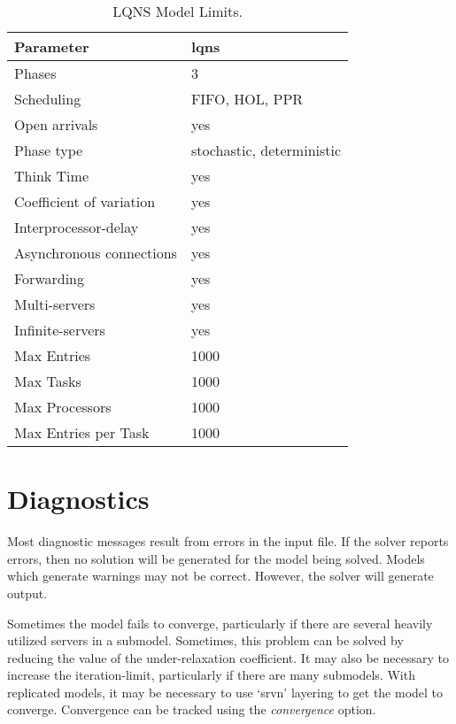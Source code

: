 \begin{table}[htbp]
  \centering
  \begin{tabular}[c]{ll}
    Parameter&lqns \\
    \hline
    Phases\index{ phase!maximum} & 3\\
    Scheduling\index{ scheduling} & FIFO, HOL, PPR\\
    Open arrivals\index{ open arrival} & yes\\
    Phase type\index{ phase!type} & stochastic, deterministic\\
    Think Time\index{ think time} & yes\\
    Coefficient of variation\index{ coefficient of variation} & yes\\
    Interprocessor-delay\index{ interprocessor delay} & yes\\
    Asynchronous connections\index{ asynchronous connections} & yes\\
    Forwarding\index{ forwarding} & yes\\
    Multi-servers\index{ multi-server} & yes\\
    Infinite-servers\index{ infinite server} & yes\\
    Max Entries\index{ entry!maximum} & 1000\\
    Max Tasks\index{ task!maximum} & 1000\\
    Max Processors\index{ processor!maximum} & 1000\\
    Max Entries per Task & 1000\\
    \hline
  \end{tabular}
  \caption{\label{tab:lqns-model-limits}LQNS Model Limits.}
\end{table}
\section{Diagnostics}
\label{sec:lqns-diagnostics}
Most diagnostic messages result from errors in the input file.
If the solver reports errors, then no solution will be generated for
the model being solved.  Models which generate warnings may not be
correct.  However, the solver will generate output.


Sometimes the model fails to converge, particularly if there are several
heavily utilized servers in a submodel.  Sometimes, this problem can
be solved by reducing the value of the under-relaxation coefficient.  It
may also be necessary to increase the iteration-limit, particularly if
there are many submodels.  With replicated models, it may be necessary
to use `srvn' layering to get the model to converge.  Convergence can be tracked
using the \emph{convergence} option.


